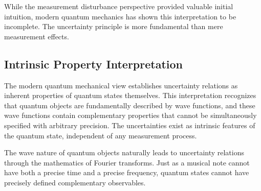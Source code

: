 \documentclass[
  a4paper,
]{book}
\begin{document}
\begin{tcolorbox}[enhanced jigsaw, coltitle=black, title=\textcolor{quarto-callout-warning-color}{\faExclamationTriangle}\hspace{0.5em}{Warning}, colframe=quarto-callout-warning-color-frame, toprule=.15mm, opacitybacktitle=0.6, left=2mm, opacityback=0, breakable, toptitle=1mm, bottomtitle=1mm, leftrule=.75mm, arc=.35mm, titlerule=0mm, colbacktitle=quarto-callout-warning-color!10!white, rightrule=.15mm, bottomrule=.15mm, colback=white]

While the measurement disturbance perspective provided valuable initial
intuition, modern quantum mechanics has shown this interpretation to be
incomplete. The uncertainty principle is more fundamental than mere
measurement effects.

\end{tcolorbox}

\subsection{Intrinsic Property
Interpretation}\label{intrinsic-property-interpretation}

The modern quantum mechanical view establishes uncertainty relations as
inherent properties of quantum states themselves. This interpretation
recognizes that quantum objects are fundamentally described by wave
functions, and these wave functions contain complementary properties
that cannot be simultaneously specified with arbitrary precision. The
uncertainties exist as intrinsic features of the quantum state,
independent of any measurement process.

\begin{tcolorbox}[enhanced jigsaw, coltitle=black, title=\textcolor{quarto-callout-note-color}{\faInfo}\hspace{0.5em}{Note}, colframe=quarto-callout-note-color-frame, toprule=.15mm, opacitybacktitle=0.6, left=2mm, opacityback=0, breakable, toptitle=1mm, bottomtitle=1mm, leftrule=.75mm, arc=.35mm, titlerule=0mm, colbacktitle=quarto-callout-note-color!10!white, rightrule=.15mm, bottomrule=.15mm, colback=white]

The wave nature of quantum objects naturally leads to uncertainty
relations through the mathematics of Fourier transforms. Just as a
musical note cannot have both a precise time and a precise frequency,
quantum states cannot have precisely defined complementary observables.

\end{tcolorbox}
\end{document}
